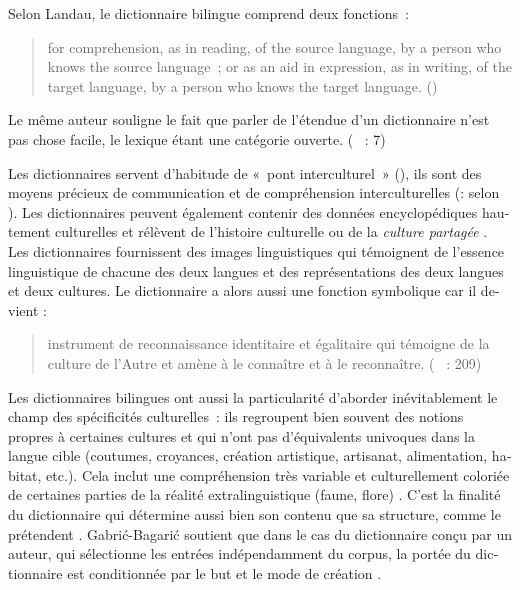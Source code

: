 \documentclass[output=paper,colorlinks,citecolor=brown,arabicfont,chinesefont,booklanguage=french]{langscibook}
\begin{document}
\begin{otherlanguage}{french}
Selon Landau, le dictionnaire bilingue comprend deux fonctions~: 

\begin{quote}
    for comprehension, as in reading, of the source language, by a person who knows the source language~; or as an aid in expression, as in writing, of the target language, by a person who knows the target language. (\citealt[9]{Landau2001})
\end{quote} 

Le même auteur souligne le fait que parler de l’étendue d’un dictionnaire n’est pas chose facile, le lexique étant une catégorie ouverte. (\citealt{Landau2001} ~: 7)

Les dictionnaires servent d’habitude de «~pont interculturel~» (\citealt{Rey2007}), ils sont des moyens précieux de communication et de compréhension interculturelles (\citealt{Wierzbicka1988}:  selon \citealt{Tallarico2013, Murano2013b, Vaxelaire2005, Tallarico2013}). Les dictionnaires peuvent également contenir des données encyclopédiques hautement culturelles et rélèvent de l’histoire culturelle \citep{Mestrovic1994} ou de la \emph{culture partagée} \citep{Galisson1988}. Les dictionnaires fournissent des images linguistiques qui témoignent de l’essence linguistique de chacune des deux langues \citep{Mestrovic1994} et des représentations des deux langues et deux cultures. Le dictionnaire a alors aussi une fonction symbolique car il devient :

\begin{quote}
    instrument de reconnaissance identitaire et égalitaire qui témoigne de la culture de l’Autre et amène à le connaître et à le reconnaître. (\citealt{Frey2007} ~: 209)
\end{quote}

Les dictionnaires bilingues ont aussi la particularité d’aborder inévitablement le champ des spécificités culturelles~: ils regroupent bien souvent des notions propres à certaines cultures et qui n’ont pas d’équivalents univoques dans la langue cible (coutumes, croyances, création artistique, artisanat, alimentation, habitat, etc.). Cela inclut une compréhension très variable et culturellement coloriée de certaines parties de la réalité extralinguistique (faune, flore) \citep{Rey1991}.
C’est la finalité du dictionnaire qui détermine aussi bien son contenu que sa structure, comme le prétendent \citep[12]{Collignon1978}. Gabrić-Bagarić soutient que dans le cas du dictionnaire conçu par un auteur, qui sélectionne les entrées indépendamment du corpus, la portée du dictionnaire est conditionnée par le but et le mode de création \citep[19]{Gabric_bagaric2010}.


\end{otherlanguage}
\end{document}

